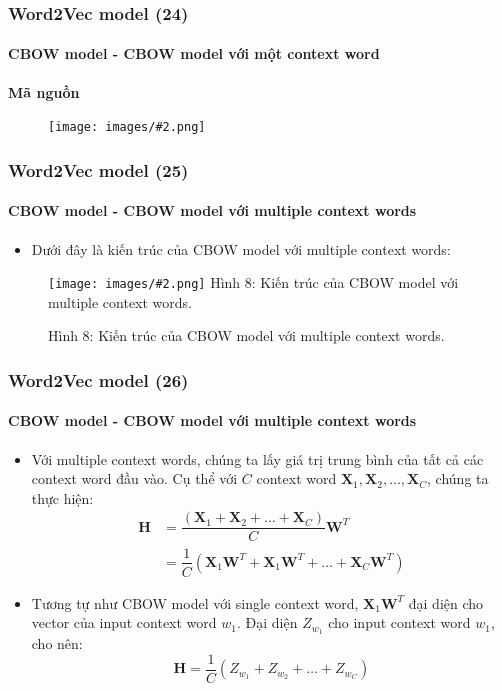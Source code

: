 \documentclass[aspectratio=169]{beamer}
\newcommand{\includeImage}[3]{
\begin{figure}[H]
    \centering
    \texttt{[image: images/\#2.png]}
    \def\temp{#3}\ifx\temp\empty\else\caption{#3}\fi
\end{figure}}
\begin{document}

\begin{frame}
    \frametitle{Word2Vec model (24)}
    \framesubtitle{CBOW model - CBOW model với một context word}
    \Large{\textbf{Mã nguồn}}
    \includeImage{0.9}{13}{}
\end{frame}

\begin{frame}
    \frametitle{Word2Vec model (25)}
    \framesubtitle{CBOW model - CBOW model với multiple context words}
    \begin{itemize}
        \item Dưới đây là kiến trúc của CBOW model với multiple context words:
    \end{itemize}
    \includeImage{0.39}{08}{Hình 8: Kiến trúc của CBOW model với multiple context words.}
\end{frame}

\begin{frame}
    \frametitle{Word2Vec model (26)}
    \framesubtitle{CBOW model - CBOW model với multiple context words}
    \begin{itemize}
        \item Với multiple context words, chúng ta lấy giá trị trung bình của tất cả các context word đầu vào. Cụ thể với $C$ context word $\boldsymbol{X}_1, \boldsymbol{X}_2, \hdots, \boldsymbol{X}_C$, chúng ta thực hiện:
        $$\begin{aligned}\boldsymbol{H} &= \dfrac{(\boldsymbol{X}_1 + \boldsymbol{X}_2 + \hdots + \boldsymbol{X}_C)}{C} \boldsymbol{W}^T \\ &= \dfrac{1}{C}(\boldsymbol{X}_1 \boldsymbol{W}^T + \boldsymbol{X}_1 \boldsymbol{W}^T + \hdots + \boldsymbol{X}_C \boldsymbol{W}^T) \end{aligned}$$
        
        \item Tương tự như CBOW model với single context word, $\boldsymbol{X}_1 \boldsymbol{W}^T$ đại diện cho vector của input context word $w_1$. Đại diện $Z_{w_1}$ cho input context word $w_1$, cho nên:
        \[\boldsymbol{H} = \dfrac{1}{C} (Z_{w_1} + Z_{w_2} + \hdots + Z_{w_C}) \tag{6} \]
    \end{itemize}
\end{frame}
\end{document}
